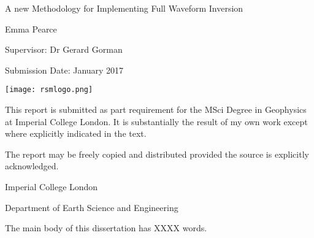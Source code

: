 \documentclass[a4paper,11pt,twoside]{report}
\begin{document}
	
\begin{titlepage}
\begin{center}

\vspace*{1in}
{\Huge A new Methodology for Implementing Full Waveform Inversion }

\vspace*{1in}
{\large Emma Pearce}


\vspace*{.25in}
{\large  Supervisor: Dr Gerard Gorman}

\vspace{.25in}

Submission Date: January 2017 \linebreak

\vspace*{0.75in}

\centerline{\texttt{[image: rsmlogo.png]}}
\vspace{0.5in}

This report is submitted as part requirement for the MSci Degree in Geophysics at Imperial College London. It is substantially the result of my own work except where explicitly indicated in the text.

The report may be freely copied and distributed provided the source is explicitly acknowledged.

Imperial College London

Department of Earth Science and Engineering

\vspace{0.25in}

The main body of this dissertation has XXXX words.

\end{center}
\end{titlepage}


\preface



\body
\listoffigures
\listoftables














\clearpage
\appendix
{}



\end{document}
